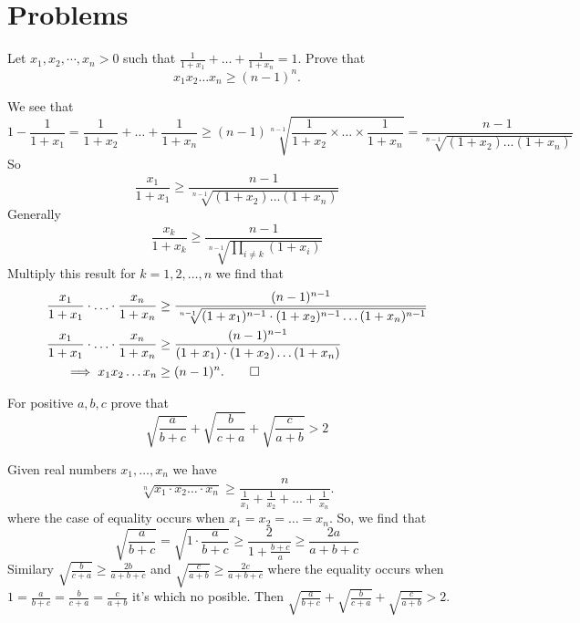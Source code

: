\section{Problems}

\begin{problem}
    Let $x_1, x_2, \cdots, x_n > 0$ such that $\frac{1}{1 + x_1} + \ldots + \frac{1}{1 + x_n} = 1$.
    Prove that
    \[
        x_1 x_2 \ldots x_n \geq (n - 1)^n.
    \]
\end{problem}

\begin{solution}
    We see that
    \[
        1 - \frac{1}{1 + x_1} = \frac{1}{1 + x_2} + \ldots + \frac{1}{1 + x_n} \geq (n - 1) \sqrt[n - 1]{\frac{1}{1 + x_2} \times \ldots \times \frac{1}{1 + x_n}} = \frac{n - 1}{\sqrt[n - 1]{(1 + x_2) \ldots (1 + x_n)}}
    \]
    So
    \[
        \frac{x_1}{1 + x_1} \geq \frac{n - 1}{\sqrt[n - 1]{(1 + x_2) \ldots (1 + x_n)}}
    \]
    Generally
    \[
        \frac{x_k}{1 + x_k} \geq \frac{n - 1}{\sqrt[n - 1]{\prod_{i \neq k} (1 + x_i)}}
    \]
    Multiply this result for $k = 1, 2, \ldots, n$ we find that
    \begin{align*}
        \frac{x_1}{1 + x_1} \cdot \ldots \cdot \frac{x_n}{1 + x_n} &\geq \frac{(n - 1)^{n - 1}}{\sqrt[n - 1]{(1 + x_1)^{n - 1} \cdot (1 + x_2)^{n - 1} \ldots (1 + x_n)^{n - 1}}}\\
        \frac{x_1}{1 + x_1} \cdot \ldots \cdot \frac{x_n}{1 + x_n} &\geq \frac{(n - 1)^{n - 1}}{(1 + x_1)\cdot (1 + x_2) \ldots (1 + x_n)}\\
        \implies x_1 x_2 \ldots x_n &\geq (n - 1)^n. \qedhere
    \end{align*}
\end{solution}


\begin{problem}
    For positive $a,b,c$ prove that
    \[
        \sqrt {\frac{a}{ b + c}} + \sqrt {\frac{b}{c + a}} + \sqrt {\frac{c}{ a + b}} > 2
    \]
\end{problem}
\begin{solution}
    Given real numbers $x_1, \ldots, x_n$ we have
    \[
        \sqrt[n]{x_1 \cdot x_2 \ldots \cdot x_n} \geq \frac{n}{\frac{1}{x_1} + \frac{1}{x_2} + \ldots + \frac{1}{x_n}}.
    \]
    where the case of equality occurs when $x_1 = x_2 = \ldots = x_n$.
    So, we find that
    \[
        \sqrt {\frac{a}{ b + c}} = \sqrt {1 \cdot \frac{a}{ b + c}} \geq \frac{2}{1 + \frac{b + c}{a}} \geq \frac{2a}{a + b + c}
    \]
    Similary $\sqrt {\frac{b}{ c + a}} \geq \frac{2b}{a + b + c}$ and $\sqrt {\frac{c}{a + b}} \geq \frac{2c}{a + b + c}$ where the equality occurs when $1 = \frac{a}{ b + c} = \frac{b}{c + a} = \frac{c}{ a + b}$ it's which no posible.
    Then $\sqrt {\frac{a}{ b + c}} + \sqrt {\frac{b}{c + a}} + \sqrt {\frac{c}{ a + b}} > 2$.
\end{solution}




